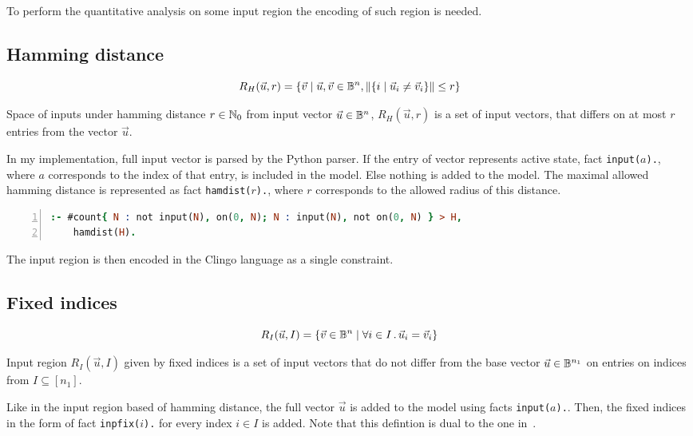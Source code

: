 \documentclass{fithesis}
\begin{document}
To perform the quantitative analysis on some input region the encoding of such
region is needed.

\subsection{Hamming distance}

\begin{equation*}
    R_H(\vec u, r) = \{\vec v \mid \vec u, \vec v \in \mathbb{B}^n,
                       \|\{i \mid \vec u_i \neq \vec v_i\}\| \leq r\}
\end{equation*}

Space of inputs under hamming distance $r\in\mathbb{N}_0$ from input vector
$\vec u\in\mathbb{B}^n$,
$R_H(\vec u, r)$ is a set of input vectors, that differs on at most $r$ entries
from the vector $\vec u$.

In my implementation, full input vector is parsed by the Python parser.
If the entry of vector represents active state, fact \texttt{input($a$).},
where $a$ corresponds to the index of that entry,
is included in the model. Else nothing is added to the model. The maximal
allowed hamming distance is represented as fact \texttt{hamdist($r$).},
where $r$ corresponds to the allowed radius of this distance.

\begin{lstlisting}[language=prolog, numbers=left, countblanklines=false]
% input space is at most hamdist from on
:- #count{ N : not input(N), on(0, N); N : input(N), not on(0, N) } > H,
    hamdist(H).
\end{lstlisting}
The input region is then encoded in the Clingo language as a single constraint.

\subsection{Fixed indices}

\begin{equation*}
    R_I(\vec u, I) = \{\vec v\in \mathbb{B}^n \mid \forall i\in I \,.\, \vec u_i = \vec v_i\}
\end{equation*}

Input region $R_I(\vec u, I)$ given by fixed indices is
a set of input vectors that do not
differ from the base vector $\vec u \in \mathbb{B}^{n_1}$ on entries
on indices from $I \subseteq [n_1]$.

Like in the input region based of hamming distance, the full vector $\vec u$
is added to the model using facts \texttt{input($a$).}. Then, the fixed indices
in the form of fact \texttt{inpfix($i$).} for every index $i\in I$ is added.
Note that this defintion is dual to the one in~\cite{10.1145/3563212}.
\end{document}
